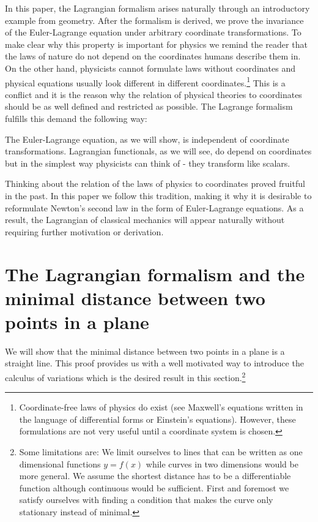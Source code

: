 \documentclass[prb,preprint]{revtex4-1}
\begin{document}
In this paper, the Lagrangian formalism arises naturally through an introductory example from geometry. After the formalism is derived, we prove the invariance of the Euler-Lagrange equation under arbitrary coordinate transformations. To make clear why this property is important for physics we remind the reader that the laws of nature do not depend on the coordinates humans describe them in. On the other hand, physicists cannot formulate laws without coordinates and physical equations usually look different in different coordinates.\footnote{Coordinate-free laws of physics do exist (see Maxwell's equations written in the language of differential forms or Einstein's equations). However, these formulations are not very useful until a coordinate system is chosen.} This is a conflict and it is the reason why the relation of physical theories to coordinates should be as well defined and restricted as possible. The Lagrange formalism fulfills this demand the following way:

The Euler-Lagrange equation, as we will show, is independent of coordinate transformations. Lagrangian functionals, as we will see, do depend on coordinates but in the simplest way physicists can think of - they transform like scalars. 

Thinking about the relation of the laws of physics to coordinates proved fruitful in the past. In this paper we follow this tradition, making it why it is desirable to reformulate Newton's second law in the form of Euler-Lagrange equations. As a result, the Lagrangian of classical mechanics will appear naturally without requiring further motivation or derivation. 


\section{The Lagrangian formalism and the minimal distance between two points in a plane \cite{goldstein2002classical}}\label{distance}

We will show that the minimal distance between two points in a plane is a straight line. This proof provides us with a well motivated way to introduce the calculus of variations which is the desired result in this section.\footnote{Some limitations are:
We limit ourselves to lines that can be written as one dimensional functions $y=f(x)$ while curves in two dimensions would be more general. We assume the shortest distance has to be a differentiable function although continuous would be sufficient. First and foremost we satisfy ourselves with finding a condition that makes the curve only stationary instead of minimal.}
\end{document}
